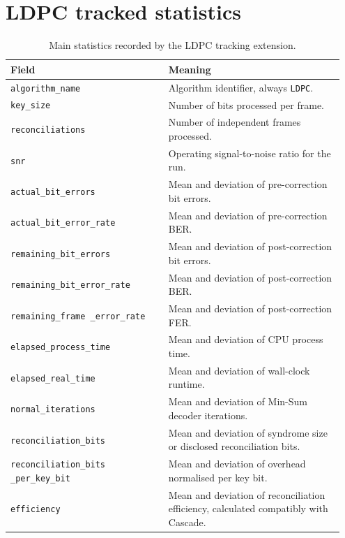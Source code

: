 \documentclass{UoYCSproject}
\begin{document}
\section{LDPC tracked statistics}

\begin{table}[!htbp]
    \centering
    \small
    \setlength{\tabcolsep}{4pt}
    \renewcommand{\arraystretch}{1.05}
    \begin{tabular}{p{0.45\linewidth} p{0.50\linewidth}}
        \hline
        Field & Meaning \\
        \hline
        \texttt{algorithm\_name} & Algorithm identifier, always \texttt{LDPC}. \\
        \texttt{key\_size} & Number of bits processed per frame. \\
        \texttt{reconciliations} & Number of independent frames processed. \\
        \texttt{snr} & Operating signal-to-noise ratio for the run. \\
        \texttt{actual\_bit\_errors} & Mean and deviation of pre-correction bit errors. \\
        \texttt{actual\_bit\_error\_rate} & Mean and deviation of pre-correction BER. \\
        \texttt{remaining\_bit\_errors} & Mean and deviation of post-correction bit errors. \\
        \texttt{remaining\_bit\_error\_rate} & Mean and deviation of post-correction BER. \\
        \texttt{remaining\_frame
        \_error\_rate} & Mean and deviation of post-correction FER. \\
        \texttt{elapsed\_process\_time} & Mean and deviation of CPU process time. \\
        \texttt{elapsed\_real\_time} & Mean and deviation of wall-clock runtime. \\
        \texttt{normal\_iterations} & Mean and deviation of Min-Sum decoder iterations. \\
        \texttt{reconciliation\_bits} & Mean and deviation of syndrome size or disclosed reconciliation bits. \\
        \texttt{reconciliation\_bits
        \_per\_key\_bit} & Mean and deviation of overhead normalised per key bit. \\
        \texttt{efficiency} & Mean and deviation of reconciliation efficiency, calculated compatibly with Cascade. \\
        \hline
    \end{tabular}
    \caption{Main statistics recorded by the LDPC tracking extension.}
    \label{tab:ldpc-tracking-fields}
\end{table}
\end{document}
